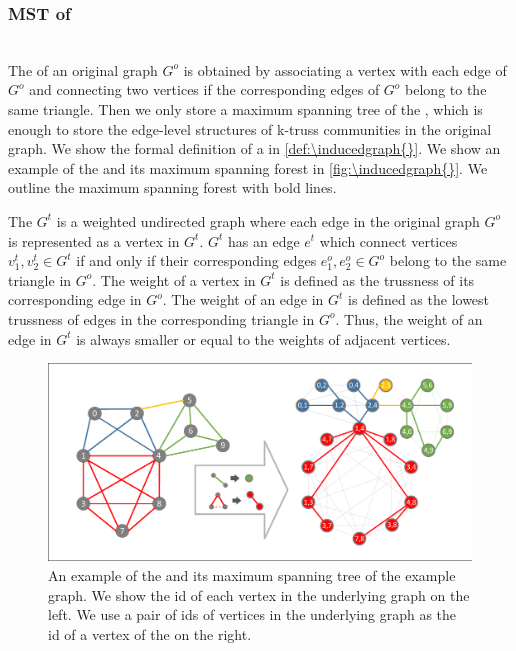 \subsubsection{MST of \InducedGraph{}}
\label{bottom-level}
~\\The \inducedgraph{} of an original graph $G^o$ is obtained by associating a vertex with each edge of $G^o$ and connecting two vertices if the corresponding edges of $G^o$ belong to the same triangle. Then we only store a maximum spanning tree of the \inducedgraph{}, which is enough to store the edge-level structures of k-truss communities in the original graph. We show the formal definition of a \inducedgraph{} in \autoref{def:\inducedgraph{}}. We show an example of the \inducedgraph{} and its maximum spanning forest in \autoref{fig:\inducedgraph{}}. We outline the maximum spanning forest with bold lines. 

\begin{Def}[\inducedgraph{}]
The \inducedgraph{} $G^t$ is a weighted undirected graph where each edge in the original graph $G^o$ is represented as a vertex in $G^t$. $G^t$ has an edge $e^{t}$ which connect vertices $v^{t}_{1}, v^{t}_{2} \in G^{t}$ if and only if their corresponding edges $e^{o}_{1}, e^{o}_{2} \in G^{o}$ belong to the same triangle in $G^o$. The weight of a vertex in $G^{t}$ is defined as the trussness of its corresponding edge in $G^o$. The weight of an edge in $G^{t}$ is defined as the lowest trussness of edges in the corresponding triangle in $G^{o}$. Thus, the weight of an edge in $G^t$ is always smaller or equal to the weights of adjacent vertices.
\label{def:\inducedgraph{}}
\end{Def}

\begin{figure}[h]
    \centering
    \includegraphics[width=0.8\linewidth, trim={0.8cm 0.6cm, 0.8cm, 0.6cm}, clip]{./figures/bottom_level.pdf}
		\vspace{-0.2cm}
    \caption{An example of the \inducedgraph{} and its maximum spanning tree of the example graph. We show the id of each vertex in the underlying graph on the left. We use a pair of ids of vertices in the underlying graph as the id of a vertex of the \inducedgraph{} on the right. }
    \label{fig:\inducedgraph{}}
		\vspace{-0.2cm}
\end{figure}

